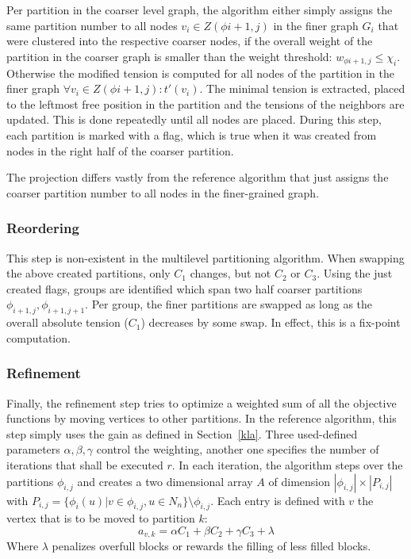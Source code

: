         Per partition in the coarser level graph, the algorithm either simply assigns the same partition number to all nodes $v_i \in Z(\phi{i+1,j})$ in the finer graph $G_i$ that were clustered into the respective coarser nodes, if the overall weight of the partition in the coarser graph is smaller than the weight threshold: $w_{\phi{i+1, j}} \leq \chi_i$.
        Otherwise the modified tension is computed for all nodes of the partition in the finer graph $\forall v_i \in Z(\phi{i+1,j}): t'(v_i)$.
        The minimal tension is extracted, placed to the leftmost free position in the partition and the tensions of the neighbors are updated. 
        This is done repeatedly until all nodes are placed.
        During this step, each partition is marked with a flag, which is true when it was created from nodes in the right half of the coarser partition.
        
        The projection differs vastly from the reference algorithm that just assigns the coarser partition number to all nodes in the finer-grained graph.
                
        \subsubsection*{Reordering}
        This step is non-existent in the multilevel partitioning algorithm.
        When swapping the above created partitions, only $C_1$ changes, but not $C_2$ or $C_3$. Using the just created flags, groups are identified which span two half coarser partitions $\phi_{i+1,j}, \phi_{i+1,j+1}$. Per group, the finer partitions are swapped as long as the overall absolute tension ($C_1$) decreases by some swap.
        In effect, this is a fix-point computation.
        
        \subsubsection*{Refinement}
        Finally, the refinement step tries to optimize a weighted sum of all the objective functions by moving vertices to other partitions.
        In the reference algorithm, this step simply uses the gain as defined in Section~\ref{kla}.
        Three used-defined parameters $\alpha, \beta, \gamma$ control the weighting, another one specifies the number of iterations that shall be executed $r$.
        In each iteration, the algorithm steps over the partitions $\phi_{i,j}$ and creates a two dimensional array $A$ of dimension $|\phi_{i,j}| \times |P_{i,j}|$ with $P_{i,j} = \{ \phi_i(u) | v \in \phi_{i,j}, u \in N_n\} \setminus \phi_{i,j}$.
        Each entry is defined with $v$ the vertex that is to be moved to partition $k$:
        \[ a_{v,k} = \alpha C_1 + \beta C_2 + \gamma C_3 + \lambda \]
        Where $\lambda$ penalizes overfull blocks or rewards the filling of less filled blocks.


